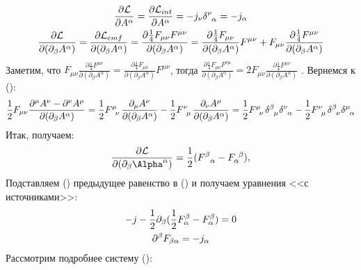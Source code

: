 \documentclass[__main__.tex]{subfiles}
\begin{document}
\begin{gather}
\frac{\partial \mathcal{L}}{\partial A^\alpha}=
\frac{\partial \mathcal{L}_{int}}{\partial  A^\alpha}=
-j_\nu\delta\indices{^\nu_\alpha} = -j_\alpha \llabel{eq:dlint} \\
%
\frac{\partial  \mathcal{L}}{\partial(\partial_\beta A^\alpha)}=\frac{\partial  \mathcal{L}_{emf}}{\partial(\partial_\beta A^\alpha)}=
\frac{\partial\frac{1}{4}F_{\mu\nu}F^{\mu\nu}}{\partial(\partial_\beta A^\alpha)} =
\frac{\partial\frac{1}{4}F_{\mu\nu}}{\partial(\partial_\beta A^\alpha)}F^{\mu\nu}+F_{\mu\nu}\frac{\partial\frac{1}{4}F^{\mu\nu}}{\partial(\partial_\beta A^\alpha)} \llabel{eq:dlda}
\end{gather}
Заметим, что
$F_{\mu\nu}\frac{\partial\frac{1}{4}F^{\mu\nu}}{\partial(\partial_\beta A^\alpha)}=\frac{\partial\frac{1}{4}F_{\mu\nu}}{\partial(\partial_\beta A^\alpha)}F^{\mu\nu}$, тогда $\frac{\partial\frac{1}{4}F_{\mu\nu}F^{\nu\mu}}{\partial(\partial_\beta A^\alpha)}=2F_{\mu\nu}\frac{\partial\frac{1}{4}F^{\mu\nu}}{\partial(\partial_\beta A^\alpha)}$
. Вернемся к ():
\begin{gather}
\frac{1}{2}F_{\mu\nu}\frac{\partial^\mu A^\nu-\partial^\nu A^\mu}{{\partial(\partial_\beta A^\alpha)}}=
\frac{1}{2}F\indices{^{\mu}_\nu}\frac{\partial_\mu A^\nu}{{\partial(\partial_\beta A^\alpha)}}-\frac{1}{2}F\indices{^{\nu}_\mu}\frac{\partial_\nu A^\mu}{{\partial(\partial_\beta A^\alpha)}}=
\frac{1}{2}\tensor{F}{^{\mu}_\nu}\tensor{\delta}{^{\beta}_\mu}\tensor{\delta}{^{\nu}_\alpha}-\frac{1}{2}\tensor{F}{^{\nu}_\mu}\tensor{\delta}{^{\beta}_\nu}\tensor{\delta}{^{\mu}_\alpha}
\end{gather}
Итак, получаем:
\begin{gather}
\frac{\partial \mathcal{L}}{\partial(\partial_\beta\Alpha^\alpha)}
=
\frac{1}{2}(F^\beta_{\ \ \alpha}-F_\alpha^{\ \beta}),
\end{gather}
Подставляем () предыдущее равенство в () и получаем уравнения <<с источниками>>:
\begin{gather}
-j-\frac{1}{2}\partial_\beta(\frac{1}{2}F^\beta_\alpha-F_\alpha^\beta)=0\\
\partial^\beta F_{\beta\alpha}=-j_\alpha \llabel{eq:dbfba}
\end{gather}
Рассмотрим подробнее систему ():
\end{document}

